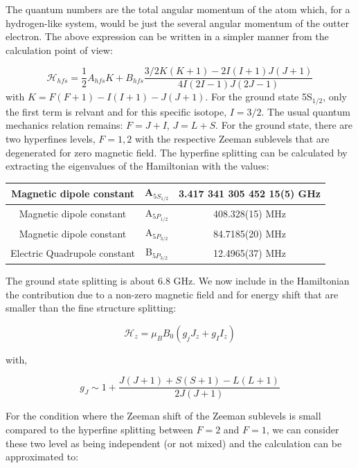 \documentclass[
10pt, %
a4paper, %
oneside, %
headinclude,footinclude, %
BCOR5mm, %
]{scrartcl}
\begin{document}
The quantum numbers are the total angular momentum of the atom which, for a hydrogen-like system, would be just the several angular momentum of the outter electron. The above expression can be written in a simpler manner from the calculation point of view:

\begin{equation}
    \mathcal{H}_{hfs} = \frac{1}{2}A_{hfs} K + B_{hfs} \frac{ 3/2 K(K+1) - 2I(I+1)J(J+1)}{4I(2I-1)J(2J-1)}
\end{equation}
with $K = F(F+1) - I(I+1) - J(J+1)$. For the ground state 5S$_{1/2}$, only the first term is relvant and for this specific isotope, $I=3/2$. The usual quantum mechanics relation remains: $F = J + I$, $J = L + S$. For the ground state, there are two hyperfines levels, $F=1,2$ with the respective Zeeman sublevels that are degenerated for zero magnetic field. The hyperfine splitting can be calculated by extracting the eigenvalues of the Hamiltonian with the values:

\begin{center}
 \begin{tabular}{||c c c||} 
 \hline
 Magnetic dipole constant & A$_{5S_{1/2}}$ &  3.417 341 305 452 15(5) GHz  \\ 
 \hline
 Magnetic dipole constant & A$_{5P_{1/2}}$ &  408.328(15) MHz \\ 
 \hline
  Magnetic dipole constant & A$_{5P_{3/2}}$ &  84.7185(20) MHz \\ 
  \hline
  Electric Quadrupole constant & B$_{5P_{3/2}}$ &  12.4965(37) MHz \\ [1ex] 
 \hline
\end{tabular}
\end{center}

The ground state splitting is about 6.8 GHz. We now include in the Hamiltonian the contribution due to a non-zero magnetic field and for energy shift that are smaller than the fine structure splitting:

\begin{equation} \label{hz_high_field}
    \mathcal{H}_{z} = \mu_{B}B_{0} (g_{j} J_{z} + g_{I} I_{z})
\end{equation}

with, 

\begin{equation}
    g_{J} \sim 1 + \frac{J(J+1) + S(S+1) - L(L+1)}{2J(J+1)}
\end{equation}

For the condition where the Zeeman shift of the Zeeman sublevels is small compared to the hyperfine splitting between $F=2$ and $F=1$, we can consider these two level as being independent (or not mixed) and the calculation can be approximated to:
\end{document}
